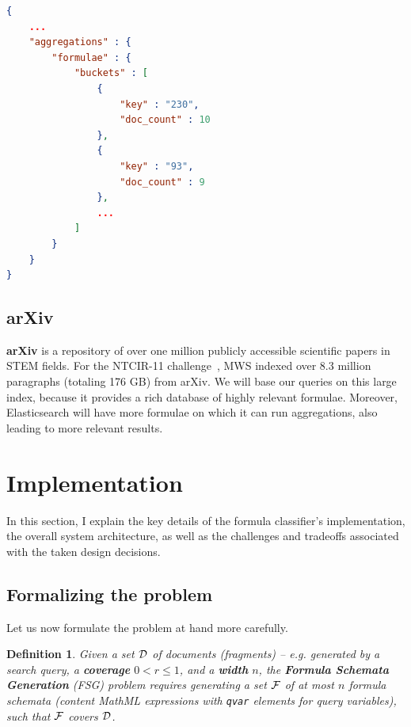 \documentclass[a4paper,11pt,oneside]{article}
\newtheorem{definition}{Definition}
\begin{document}
\begin{lstlisting}[language=json,firstnumber=1,caption=Elastic Search Term
Aggregation Response, captionpos=b, label=lst:es_agg_resp]
{
    ...
    "aggregations" : {
        "formulae" : {
            "buckets" : [
                {
                    "key" : "230",
                    "doc_count" : 10
                },
                {
                    "key" : "93",
                    "doc_count" : 9
                },
                ...
            ]
        }
    }
}
\end{lstlisting}

\subsection{arXiv}\label{subsec:arxiv}
\textbf{arXiv} is a repository of over one million publicly accessible
scientific papers in STEM fields. For the NTCIR-11
challenge~\cite{HamKohPro:man14},
MWS indexed over 8.3 million paragraphs (totaling 176 GB) from arXiv. We will
base our queries on this large index, because it provides a rich database of
highly relevant formulae. Moreover, Elasticsearch will have more formulae on
which it can run aggregations, also leading to more relevant results.


\section{Implementation}\label{sec:implementation}

In this section, I explain the key details of the formula classifier's
implementation, the overall system architecture, as well as the challenges and
tradeoffs associated with the taken design decisions.

\subsection{Formalizing the problem}\label{subsec:formal_problem}
Let us now formulate the problem at hand more carefully.

\begin{definition}
  Given a set $\mathcal{D}$ of documents (fragments) -- e.g. generated by a search
  query, a \textbf{coverage} $0<r\leq1$, and a \textbf{width} $n$, the
  \textbf{Formula Schemata Generation} (FSG) problem requires generating
  a set $\mathcal{F}$ of at most $n$ formula schemata (content MathML expressions with
  \lstinline|qvar| elements for query variables), such that $\mathcal{F}$ covers $\mathcal{D}$.
\end{definition}
\end{document}
